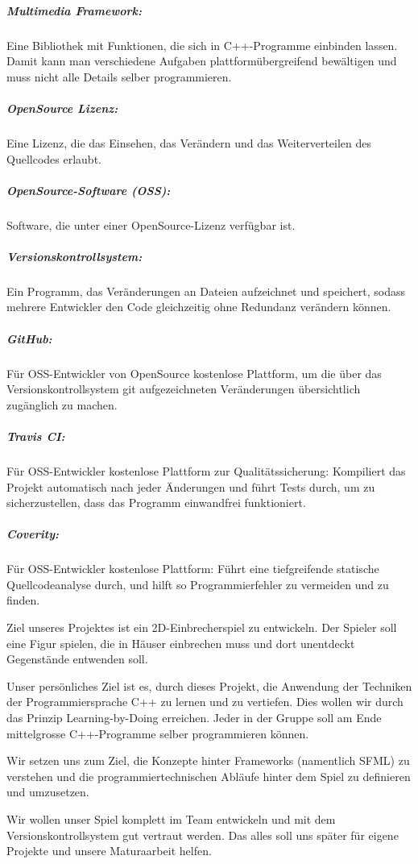 \documentclass[parskip=half]{scrreprt}
\begin{document}
\begin{contract}
\subparagraph{Multimedia Framework:}
Eine Bibliothek mit Funktionen, die sich in C++-Programme einbinden lassen. Damit kann man verschiedene Aufgaben plattformübergreifend bewältigen und muss nicht alle Details selber programmieren.

\subparagraph{OpenSource Lizenz:}

Eine Lizenz, die das Einsehen, das Verändern und das Weiterverteilen des Quellcodes erlaubt.

\subparagraph{OpenSource-Software (OSS):}
Software, die unter einer OpenSource-Lizenz verfügbar ist.

\subparagraph{Versionskontrollsystem:}
Ein Programm, das Veränderungen an Dateien aufzeichnet und speichert, sodass mehrere Entwickler den Code gleichzeitig ohne Redundanz verändern können.

\subparagraph{GitHub:}
Für OSS-Entwickler von OpenSource kostenlose Plattform, um die über das Versionskontrollsystem git aufgezeichneten Veränderungen übersichtlich zugänglich zu machen.

\subparagraph{Travis CI:}
Für OSS-Entwickler kostenlose Plattform zur Qualitätssicherung: Kompiliert das Projekt automatisch nach jeder Änderungen und führt Tests durch, um zu sicherzustellen, dass das Programm einwandfrei funktioniert.

\subparagraph{Coverity:}
Für OSS-Entwickler kostenlose Plattform: Führt eine tiefgreifende statische Quellcodeanalyse durch, und hilft so Programmierfehler zu vermeiden und zu finden.


Ziel unseres Projektes ist ein 2D-Einbrecherspiel zu entwickeln. Der Spieler soll eine Figur spielen, die in Häuser einbrechen muss und dort unentdeckt Gegenstände entwenden soll.

Unser persönliches Ziel ist es, durch dieses Projekt, die Anwendung der Techniken der
Programmiersprache C++ zu lernen und zu vertiefen. Dies wollen wir durch
das Prinzip Learning-by-Doing erreichen. Jeder in der Gruppe soll am Ende
mittelgrosse C++-Programme selber programmieren können.

Wir setzen uns zum Ziel,
die Konzepte hinter Frameworks (namentlich SFML) zu verstehen und die
programmiertechnischen Abläufe hinter dem Spiel zu definieren und
umzusetzen.

Wir wollen unser Spiel komplett im Team entwickeln und
mit dem Versionskontrollsystem gut vertraut werden. Das alles soll uns später
für eigene Projekte und unsere Maturaarbeit helfen.


\end{contract}
\end{document}
